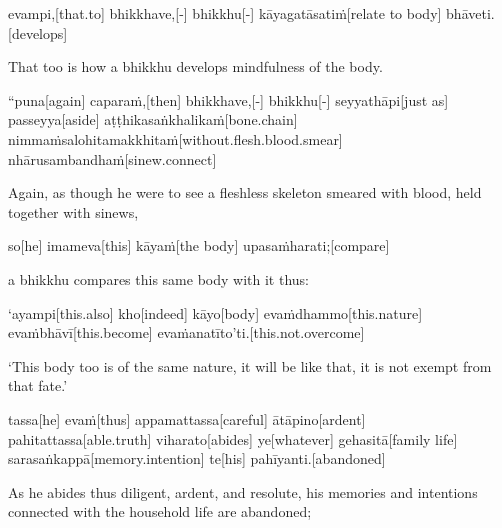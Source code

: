 \begin{samepage}
\begingl[glneveryline={\PaliGlossA,\PaliGlossB}]
evampi,[that.to] bhikkhave,[-] bhikkhu[-] kāyagatāsatiṁ[relate to body] bhāveti.[develops]
\endgl
\nopagebreak
\linespread{0.5}
\begin{spacin}{0.2}
{\PaliGlossFT That too is how a bhikkhu develops mindfulness of the body.}
\end{spacin}
\vskip 12pt
\end{samepage}
\vskip 0.05in
\begin{samepage}
\begingl[glneveryline={\PaliGlossA,\PaliGlossB}]
“puna[again] caparaṁ,[then] bhikkhave,[-] bhikkhu[-] seyyathāpi[just as] passeyya[aside] aṭṭhikasaṅkhalikaṁ[bone.chain] nimmaṁsalohitamakkhitaṁ[without.flesh.blood.smear] nhārusambandhaṁ[sinew.connect]
\endgl
\nopagebreak
\linespread{0.5}
\begin{spacin}{0.2}
{\PaliGlossFT Again, as though he were to see a fleshless skeleton smeared with blood, held together with sinews,}
\end{spacin}
\vskip 12pt
\end{samepage}
\begin{samepage}
\begingl[glneveryline={\PaliGlossA,\PaliGlossB}]
so[he] imameva[this] kāyaṁ[the body] upasaṁharati;[compare]
\endgl
\nopagebreak
\linespread{0.5}
\begin{spacin}{0.2}
{\PaliGlossFT a bhikkhu compares this same body with it thus:}
\end{spacin}
\vskip 12pt
\end{samepage}
\begin{samepage}
\begingl[glneveryline={\PaliGlossA,\PaliGlossB}]
‘ayampi[this.also] kho[indeed] kāyo[body] evaṁdhammo[this.nature] evaṁbhāvī[this.become] evaṁanatīto’ti.[this.not.overcome]
\endgl
\nopagebreak
\linespread{0.5}
\begin{spacin}{0.2}
{\PaliGlossFT ‘This body too is of the same nature, it will be like that, it is not exempt from that fate.’}
\end{spacin}
\vskip 12pt
\end{samepage}
\begin{samepage}
\begingl[glneveryline={\PaliGlossA,\PaliGlossB}]
tassa[he] evaṁ[thus] appamattassa[careful] ātāpino[ardent] pahitattassa[able.truth] viharato[abides] ye[whatever] gehasitā[family life] sarasaṅkappā[memory.intention] te[his] pahīyanti.[abandoned]
\endgl
\nopagebreak
\linespread{0.5}
\begin{spacin}{0.2}
{\PaliGlossFT As he abides thus diligent, ardent, and resolute, his memories and intentions connected with the household life are abandoned;}
\end{spacin}
\vskip 12pt
\end{samepage}

